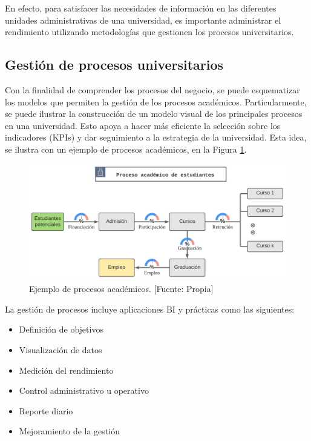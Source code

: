 \documentclass[11pt,titlepage]{report}
\begin{document}
En efecto, para satisfacer las necesidades de información en las diferentes unidades administrativas de una universidad, es importante administrar el rendimiento utilizando metodologías que gestionen los procesos universitarios.\\


\subsection{Gestión de procesos universitarios}
Con la finalidad de comprender los procesos del negocio, se puede esquematizar los modelos que permiten la gestión de los procesos académicos. Particularmente, se puede ilustrar la construcción de un modelo visual de los principales procesos en una universidad. Esto apoya a hacer más eficiente la selección sobre los indicadores (KPIs) y dar seguimiento a la estrategia de la universidad. Esta idea, se ilustra con un ejemplo de procesos académicos, en la Figura \ref{fig: ProcesoU}.

\begin{figure}[h]
\centering
\includegraphics[width=1\linewidth]{Figuras/ProcesoU}
\caption{Ejemplo de procesos académicos. [Fuente: Propia]}
\label{fig: ProcesoU}
\end{figure}

La gestión de procesos incluye aplicaciones BI y prácticas como las siguientes:
\begin{itemize}
\item Definición de objetivos
\item Visualización de datos
\item Medición del rendimiento
\item Control administrativo u operativo 
\item Reporte diario
\item Mejoramiento de la gestión
\end{itemize}
\end{document}
